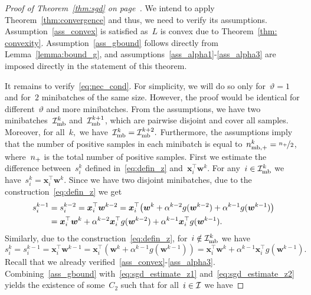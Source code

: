 \sgd*
\begin{proof}[Proof of Theorem~\ref{thm:sgd} on page~\pageref{thm:sgd}]
  We intend to apply Theorem~\ref{thm:convergence} and thus, we need to verify its assumptions. Assumption~\ref{ass_convex} is satisfied as~$L$ is convex due to Theorem~\ref{thm: convexity}. Assumption~\ref{ass_gbound} follows directly from Lemma~\ref{lemma:bound_g}, and assumptions~\ref{ass_alpha1}-\ref{ass_alpha3} are imposed directly in the statement of this theorem.

  It remains to verify~\eqref{eq:nec_cond}. For simplicity, we will do so only for~$\vartheta = 1$ and for~$2$ minibatches of the same size. However, the proof would be identical for different~$\vartheta$ and more minibatches. From the assumptions, we have two minibatches~$\mathcal{I}_{\text{mb}}^k$ and~$\mathcal{I}_{\text{mb}}^{k+1}$, which are pairwise disjoint and cover all samples. Moreover, for all~$k,$ we have~$\mathcal{I}_{\text{mb}}^k = \mathcal{I}_{\text{mb}}^{k+2}.$ Furthermore, the assumptions imply that the number of positive samples in each minibatch is equal to~$n_{\text{mb},+}^k = \nicefrac{n_{+}}{2}$, where~$n_{+}$ is the total number of positive samples. First we estimate the difference between~$s_i^k$ defined in~\eqref{eq:defin_z} and~$\bm{x}_i^\top \bm{w}^k$. For any~$i \in \mathcal{I}_{\text{mb}}^k$ we have~$s_i^k = \bm{x}_i^\top \bm{w}^k.$ Since we have two disjoint minibatches, due to the construction~\eqref{eq:defin_z} we get
  \begin{equation}\label{eq:sgd_estimate_z1}
    \begin{aligned}
      s_i^{k-1}
        & = s_i^{k-2}
          = \bm{x}_i^\top \bm{w}^{k-2}
          = \bm{x}_i^\top \Brac{\bm{w}^k + \alpha^{k-2}g(\bm{w}^{k-2}) + \alpha^{k-1} g(\bm{w}^{k-1})} \\
        & = \bm{x}_i^\top \bm{w}^k + \alpha^{k-2}\bm{x}_i^\top g(\bm{w}^{k-2}) + \alpha^{k-1}\bm{x}_i^\top g(\bm{w}^{k-1}).
    \end{aligned}
  \end{equation}
  Similarly, due to the construction~\eqref{eq:defin_z}, for~$i \notin \mathcal{I}_{\text{mb}}^k$ we have
  \begin{equation}\label{eq:sgd_estimate_z2}
    s_i^k
    = s_i^{k-1}
    = \bm{x}_i^\top \bm{w}^{k-1}
    = \bm{x}_i^\top (\bm{w}^k+\alpha^{k-1}g(\bm{w}^{k-1}))
    = \bm{x}_i^\top \bm{w}^k + \alpha^{k-1}\bm{x}_i^\top g(\bm{w}^{k-1}).
  \end{equation}
  Recall that we already verified~\ref{ass_convex}-\ref{ass_alpha3}. Combining~\ref{ass_gbound} with~\eqref{eq:sgd_estimate_z1} and~\eqref{eq:sgd_estimate_z2} yields the existence of some~$C_2$ such that for all~$i \in \mathcal{I}$ we have

\end{proof}
